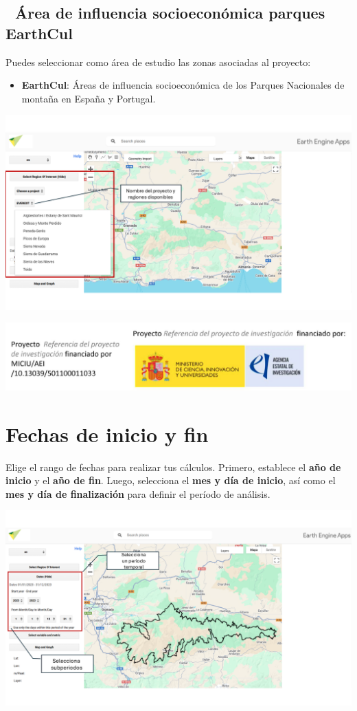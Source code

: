 \documentclass[
]{book}
\providecommand{\tightlist}{%
  \setlength{\itemsep}{0pt}\setlength{\parskip}{0pt}}
\begin{document}
\section{\texorpdfstring{\textbf{📁 Área de influencia socioeconómica parques EarthCul}}{📁 Área de influencia socioeconómica parques EarthCul}}\label{uxe1rea-de-influencia-socioeconuxf3mica-parques-earthcul-1}

Puedes seleccionar como área de estudio las zonas asociadas al proyecto:

\begin{itemize}
\tightlist
\item
  \textbf{EarthCul}: Áreas de influencia socioeconómica de los Parques Nacionales de montaña en España y Portugal.
\end{itemize}

\includegraphics{assets/PROJECTS_es.png}

\includegraphics{assets/logo.jpeg}

\chapter{Fechas de inicio y fin}\label{fechas}

Elige el rango de fechas para realizar tus cálculos. Primero, establece el \textbf{año de inicio} y el \textbf{año de fin}. Luego, selecciona el \textbf{mes y día de inicio}, así como el \textbf{mes y día de finalización} para definir el período de análisis.

\includegraphics{assets/dates_es.png}
\end{document}
